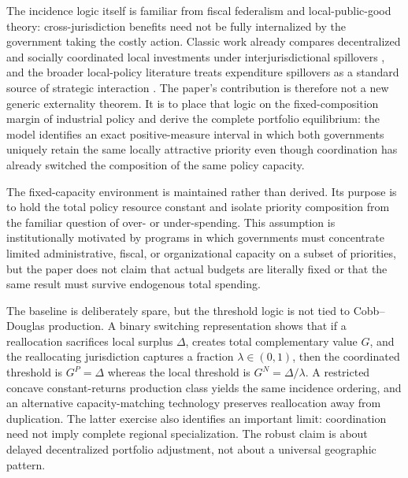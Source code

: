The incidence logic itself is familiar from fiscal federalism and local-public-good theory: cross-jurisdiction benefits need not be fully internalized by the government taking the costly action. Classic work already compares decentralized and socially coordinated local investments under interjurisdictional spillovers \citep{CremerMarchandPestieau1997,BlochZenginobuz2007,Takahashi2004}, and the broader local-policy literature treats expenditure spillovers as a standard source of strategic interaction \citep{AgrawalHoytWilson2022}. The paper's contribution is therefore not a new generic externality theorem. It is to place that logic on the fixed-composition margin of industrial policy and derive the complete portfolio equilibrium: the model identifies an exact positive-measure interval in which both governments uniquely retain the same locally attractive priority even though coordination has already switched the composition of the same policy capacity.

The fixed-capacity environment is maintained rather than derived. Its purpose is to hold the total policy resource constant and isolate priority composition from the familiar question of over- or under-spending. This assumption is institutionally motivated by programs in which governments must concentrate limited administrative, fiscal, or organizational capacity on a subset of priorities, but the paper does not claim that actual budgets are literally fixed or that the same result must survive endogenous total spending.

The baseline is deliberately spare, but the threshold logic is not tied to Cobb--Douglas production. A binary switching representation shows that if a reallocation sacrifices local surplus $\Delta$, creates total complementary value $G$, and the reallocating jurisdiction captures a fraction $\lambda\in(0,1)$, then the coordinated threshold is $G^P=\Delta$ whereas the local threshold is $G^N=\Delta/\lambda$. A restricted concave constant-returns production class yields the same incidence ordering, and an alternative capacity-matching technology preserves reallocation away from duplication. The latter exercise also identifies an important limit: coordination need not imply complete regional specialization. The robust claim is about delayed decentralized portfolio adjustment, not about a universal geographic pattern.

